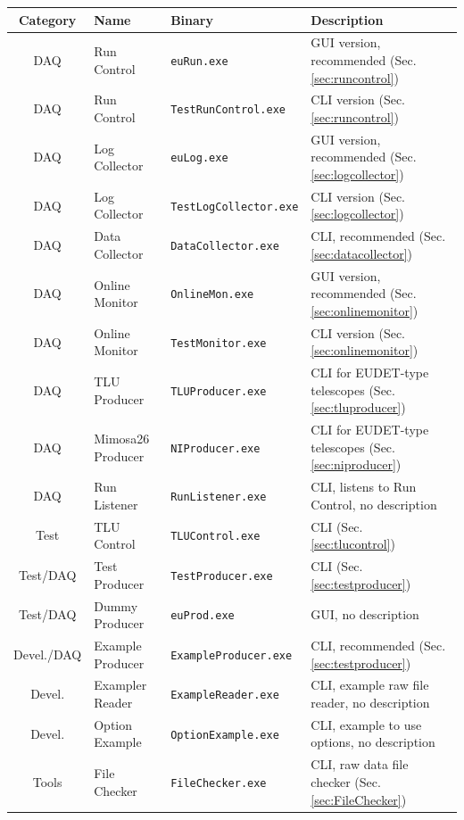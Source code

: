 \begin{table}
\centering
\small
\begin{tabular}{ c | l | l | p{4cm}}
  \textbf{Category} & \textbf{Name} & \textbf{Binary}  & \textbf{Description}\\
  \hline			
  \hline			
  DAQ & Run Control & \texttt{euRun.exe} & GUI version, recommended (Sec. \ref{sec:runcontrol}) \\
  DAQ & Run Control & \texttt{TestRunControl.exe} & CLI version (Sec. \ref{sec:runcontrol}) \\
  DAQ & Log Collector & \texttt{euLog.exe} & GUI version, recommended (Sec. \ref{sec:logcollector}) \\
  DAQ & Log Collector & \texttt{TestLogCollector.exe} & CLI version (Sec. \ref{sec:logcollector}) \\
  DAQ & Data Collector & \texttt{DataCollector.exe} & CLI, recommended (Sec. \ref{sec:datacollector}) \\
  DAQ & Online Monitor & \texttt{OnlineMon.exe} & GUI version, recommended (Sec. \ref{sec:onlinemonitor}) \\
  DAQ & Online Monitor & \texttt{TestMonitor.exe} & CLI version (Sec. \ref{sec:onlinemonitor}) \\
  DAQ & TLU Producer & \texttt{TLUProducer.exe} & CLI for EUDET-type telescopes (Sec. \ref{sec:tluproducer}) \\
  DAQ & Mimosa26 Producer & \texttt{NIProducer.exe} & CLI for EUDET-type telescopes (Sec. \ref{sec:niproducer}) \\
  DAQ & Run Listener & \texttt{RunListener.exe} & CLI, listens to Run Control, no description \\
  \hline
  Test & TLU Control & \texttt{TLUControl.exe} & CLI (Sec. \ref{sec:tlucontrol}) \\
  Test/DAQ & Test Producer & \texttt{TestProducer.exe} & CLI (Sec. \ref{sec:testproducer}) \\
  Test/DAQ & Dummy Producer & \texttt{euProd.exe} & GUI, no description \\
  Devel./DAQ & Example Producer & \texttt{ExampleProducer.exe} & CLI, recommended (Sec. \ref{sec:testproducer}) \\
  Devel. & Exampler Reader & \texttt{ExampleReader.exe} & CLI, example raw file reader, no description \\
  Devel. & Option Example & \texttt{OptionExample.exe} & CLI, example to use options, no description \\
  \hline
  Tools & File Checker & \texttt{FileChecker.exe} & CLI, raw data file checker (Sec. \ref{sec:FileChecker}) \\

\end{tabular}
\end{table}
